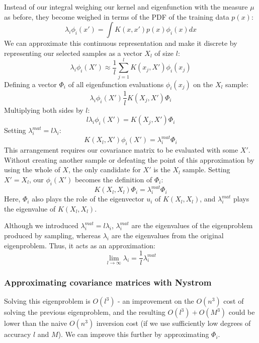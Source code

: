 Instead of our integral weighing our kernel and eigenfunction with the measure $\mu$ as before, they become weighed in terms of the PDF of the training data $p(x)$:
\begin{equation*}
    \lambda_i \phi_i(x') = \int K(x, x') p(x) \phi_i(x) dx
\end{equation*}
We can approximate this continuous representation and make it discrete by representing our selected samples as a vector $X_l$ of size $l$:
\begin{equation*}
    \lambda_i \phi_i(X') \approx \frac{1}{l} \sum_{j=1}^{l} K(x_j, X') \phi_i(x_j)
\end{equation*}
Defining a vector $\Phi_i$ of all eigenfunction evaluations $\phi_i(x_j)$ on the $X_l$ sample:
\begin{equation*}
    \lambda_i \phi_i(X') \frac{1}{l} K(X_j, X') \Phi_i
\end{equation*}
Multiplying both sides by $l$:
\begin{equation*}
    l \lambda_i \phi_i(X') = K(X_j, X') \Phi_i
\end{equation*}
Setting $\lambda_i^{mat} = l \lambda_i$:
\begin{equation*}
    K(X_l, X') \phi_i(X') = \lambda_i^{mat} \Phi_i
\end{equation*}
This arrangement requires our covariance matrix to be evaluated with some $X'$. Without creating another sample or defeating the point of this approximation by using the whole of $X$, the only candidate for $X'$ is the $X_l$ sample. Setting $X' = X_l$, our $\phi_i(X')$ becomes the definition of $\Phi_i$:
\begin{equation} \label{eq:eigenproblem_sampled}
    K(X_l, X_l) \Phi_i = \lambda_i^{mat} \Phi_i
\end{equation}
Here, $\Phi_i$ also plays the role of the eigenvector $u_i$ of $K(X_l, X_l)$, and $\lambda_i^{mat}$ plays the eigenvalue of $K(X_l, X_l)$. 

Although we introduced $\lambda_i^{mat} = l \lambda_i$, $\lambda_i^{mat}$ are the eigenvalues of the eigenproblem produced by sampling, whereas $\lambda_i$ are the eigenvalues from the original eigenproblem. Thus, it acts as an approximation:
\begin{equation*}
    \lim_{l \to \infty} \lambda_i = \frac{1}{l} \lambda_i^{mat} 
\end{equation*}

\subsubsection{Approximating covariance matrices with Nystrom}
Solving this eigenproblem is $O(l^3)$ - an improvement on the $O(n^3)$ cost of solving the previous eigenproblem, and the resulting $O(l^3) + O(M^3)$ could be lower than the naive $O(n^3)$ inversion cost (if we use sufficiently low degrees of accuracy $l$ and $M$). We can improve this further by approximating $\Phi_i$.

